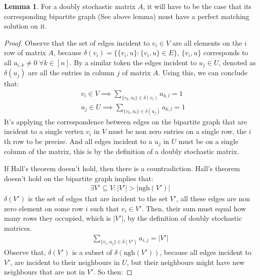 \documentclass[]{article}
\theoremstyle{definition}
\newtheorem{lemma}{Lemma}[subsection]  %
\begin{document}
        \begin{lemma}
            For a doubly stochastic matrix $A$, it will have to be the case that its corresponding bipartite graph (See above lemma) must have a perfect matching solution on it.
        \end{lemma}
        \begin{proof}
            Observe that the set of edges incident to $v_i\in V$ are all elements on the $i$ row of matrix $A$, because $\delta(v_i) = \{\{v_i, u\}: \{v_i, u\}\in E\}$, $\{v_i, u\}$ corresponds to all $a_{i, k} \neq 0 \;\forall k\in [n]$. By a similar token the edges incident to $u_j\in U$, denoted as $\delta(u_j)$ are all the entries in column $j$ of matrix $A$. Using this, we can conclude that: 
            \begin{align}
                & v_i\in  V \implies \sum_{\{v_k, u_l\}\in \delta(v_i)}^{}a_{k, l} = 1
                \\
                & u_j\in  U \implies \sum_{\{v_k, u_l\}\in \delta(u_j)}^{}a_{k, l} = 1
            \end{align}
            It's applying the correspondence between edges on the bipartite graph that are incident to a single vertex $v_i$ in $V$ must be non zero entries on a single row, the $i$ th row to be precise. And all edges incident to a $u_j$ in $U$ must be on a single column of the matrix, this is by the definition of a doubly stochastic matrix. 
            \par
            If Hall's theorem doesn't hold, then there is a countradiction. Hall's theorem doesn't hold on the bipartite graph implies that: 
            \begin{align}
                \exists V'\subseteq V: 
                    |V'| > |\text{ngh}(V')|
            \end{align}
            $\delta(V')$ is the set of edges that are incident to the set $V'$, all these edges are non zero element on some row $i$ such that $v_{i}\in V'$. Then, their sum must equal how many rows they occupied, which is $|V'|$, by the definition of doubly stochastic matrices. 
            \begin{align}
                \sum_{\{v_{i}, u_{j}\}\in \delta (V')}^{}
                a_{i, j} = |V'|
            \end{align}
            Observe that, $\delta(V')$ is a subset of $\delta(\text{ngh}(V'))$, because all edges incident to $V'$, are incident to their neighbours in $U$, but their neighbours might have new neighbours that are not in $V'$. So then: 

\end{proof}
\end{document}
